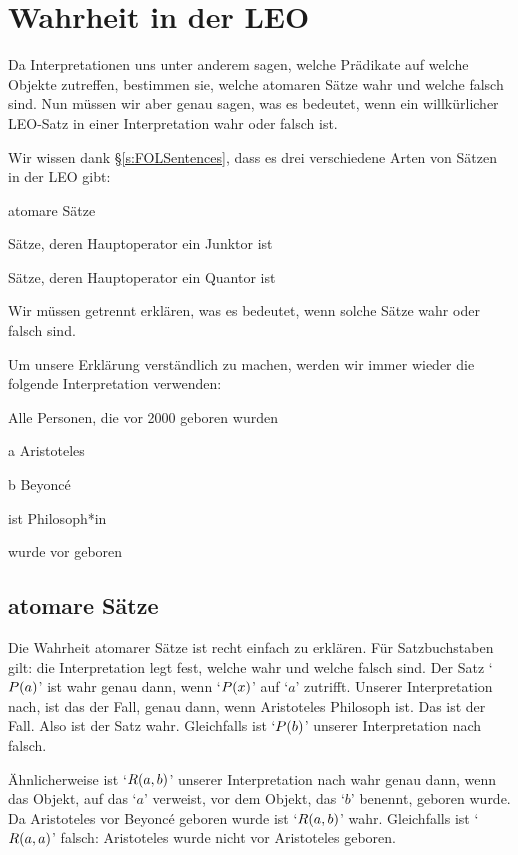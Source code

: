 \chapter{Wahrheit in der LEO}\label{s:TruthFOL}
Da Interpretationen uns unter anderem sagen, welche Prädikate auf welche Objekte zutreffen, bestimmen sie, welche atomaren Sätze wahr und welche falsch sind. Nun müssen wir aber genau sagen, was es bedeutet, wenn ein willkürlicher LEO-Satz in einer Interpretation wahr oder falsch ist. 

Wir wissen dank \S\ref{s:FOLSentences}, dass es drei verschiedene Arten von Sätzen in der LEO gibt: 
	\begin{ebullet}
		\item atomare Sätze
		\item Sätze, deren Hauptoperator ein Junktor ist
		\item Sätze, deren Hauptoperator ein Quantor ist
	\end{ebullet}
Wir müssen getrennt erklären, was es bedeutet, wenn solche Sätze wahr oder falsch sind.

Um unsere Erklärung verständlich zu machen, werden wir immer wieder die folgende Interpretation verwenden:
	\begin{ekey}
		\item[\text{Domäne}] Alle Personen, die vor 2000 geboren wurden
		\item[a] Aristoteles
		\item[b] Beyonc\'e
		\item[\atom{P}{x}]  ist Philosoph*in
		\item[\atom{R}{x,y}]  wurde vor  geboren
	\end{ekey}

\section{atomare Sätze}
Die Wahrheit atomarer Sätze ist recht einfach zu erklären. Für Satzbuchstaben gilt: die Interpretation legt fest, welche wahr und welche falsch sind. Der Satz `$\mathord{P}(a)$' ist wahr genau dann, wenn `$\mathord{P}(x)$' auf `$a$' zutrifft. Unserer Interpretation nach, ist das der Fall, genau dann, wenn Aristoteles Philosoph ist. Das ist der Fall. Also ist der Satz wahr. Gleichfalls ist `$\mathord{P}(b)$' unserer Interpretation nach falsch.

Ähnlicherweise ist `$\mathord{R}(a,b)$' unserer Interpretation nach wahr genau dann, wenn das Objekt, auf das `$a$' verweist, vor dem Objekt, das `$b$' benennt, geboren wurde. Da Aristoteles vor Beyonc\'e geboren wurde ist `$\mathord{R}(a,b)$' wahr. Gleichfalls ist `$\mathord{R}(a,a)$' falsch: Aristoteles wurde nicht vor Aristoteles geboren. 

